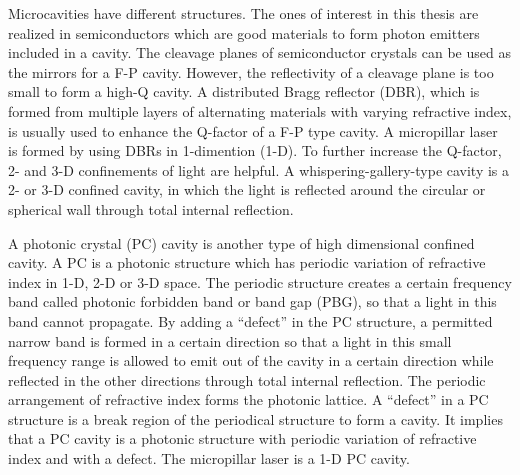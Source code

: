 Microcavities have different structures.  The ones of interest in this thesis are realized in semiconductors which are good materials to form photon emitters included in a cavity. The cleavage planes of semiconductor crystals can be used as the mirrors for a F-P cavity. However, the reflectivity of a cleavage plane is too small to form a high-Q cavity. A distributed Bragg reflector (DBR), which is formed from multiple layers of alternating materials with varying refractive index, is usually used to enhance the Q-factor of a F-P type cavity. A micropillar laser~\cite{Vahala2003} is formed by using DBRs in 1-dimention (1-D). To further increase the Q-factor, 2- and 3-D confinements of light are helpful. A whispering-gallery-type cavity is a 2- or 3-D confined cavity, in which the light is reflected around the circular or spherical wall through total internal reflection.

A photonic crystal (PC) cavity is another type of high dimensional confined cavity. A PC is a photonic structure which has periodic variation of refractive index in 1-D, 2-D or 3-D space. The periodic structure creates a certain frequency band called photonic forbidden band or band gap (PBG), so that a light in this band cannot propagate. By adding a ``defect'' in the PC structure, a permitted narrow band is formed in a certain direction so that a light in this small frequency range is allowed to emit out of the cavity in a certain direction while reflected in the other directions through total internal reflection. The periodic arrangement of refractive index forms the photonic lattice. A ``defect'' in a PC structure is a break region of the periodical structure to form a cavity. It implies that a PC cavity is a photonic structure with periodic variation of refractive index and with a defect. The micropillar laser is a 1-D PC cavity.

